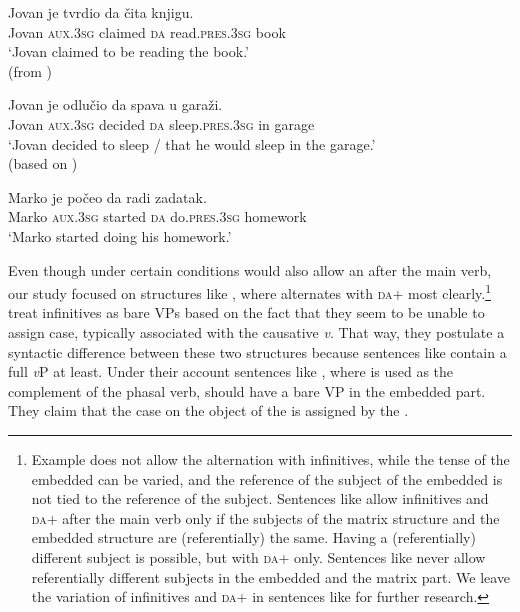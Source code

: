 \documentclass[output=paper,modfonts,newtxmath,hidelinks,]{langscibook}
\begin{document}
\ea \label{7:ex8}
\gll { }Jovan je tvrdio da čita knjigu.\\
     { }Jovan \textsc{aux.3sg} claimed \textsc{da} read.\textsc{pres.3sg} book\\
\glt { }`Jovan claimed to be reading the book.'\\\hfill (from \citealt{TodorovicWurmbrand2015})
\z

\ea \label{7:ex9}
\gll { }Jovan je odlučio da spava u garaži.\\
     { }Jovan \textsc{aux.3sg} decided \textsc{da} sleep.\textsc{pres.3sg} in garage\\
\glt { }`Jovan decided to sleep / that he would sleep in the garage.'\\
\hfill (based on \citealt{TodorovicWurmbrand2015})
\z

\ea \label{7:ex10}
\gll { }Marko je počeo da radi zadatak.\\
     { }Marko \textsc{aux.3sg} started \textsc{da} do.\textsc{pres.3sg} homework\\
\glt { }`Marko started doing his homework.'
\z

\noindent Even though under certain conditions  would also allow an  after the main verb, our study focused on structures like , where  alternates with 
\textsc{da}+ most clearly.\footnote{\label{7:fn3}Example  does not allow the alternation with infinitives, while the tense of the embedded  can be varied, and the reference of the subject of the embedded  is not tied to the reference of the  subject. Sentences like  allow infinitives and \textsc{da}+ after the main verb only if the subjects of the matrix structure and the embedded structure are (referentially) the same. Having a (referentially) different subject is possible, but with \textsc{da}+ only. Sentences like  never allow referentially different subjects in the embedded and the matrix part. We leave the variation of infinitives and \textsc{da}+ in sentences like  for further research.} \citet{TodorovicWurmbrand2015} treat infinitives as bare VPs based on the fact that they seem to be unable to assign  case, typically associated with the causative \textit{v}. That way, they postulate a syntactic difference between these two structures because sentences like  contain a full \textit{v}P at least. Under their account sentences like , where  is used as the complement of the phasal verb, should have a bare VP in the embedded part. They claim that the  case on the object of the  is assigned by the . 
\end{document}
